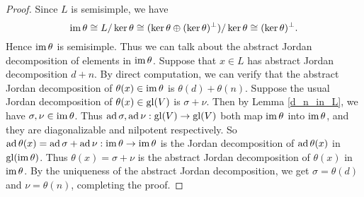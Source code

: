 \begin{proof}
    Since $L$ is semisimple, we have 
    \[
        \operatorname{im} \theta \cong L / \ker \theta \cong (\ker \theta \oplus (\ker \theta )^\perp) / \ker \theta \cong (\ker \theta)^\perp.
    \]
    Hence $\operatorname{im} \theta$ is semisimple. Thus we can talk about the abstract Jordan decomposition of elements in $\operatorname{im}\theta$. Suppose that $x\in L$ has abstract Jordan decomposition $d+n$. By direct computation, we can verify that the abstract Jordan decomposition of $\theta(x)\in\operatorname{im} \theta$ is $\theta(d)+\theta(n)$. Suppose the usual Jordan decomposition of $\theta(x)\in\mathrm{gl}(V)$ is $\sigma+\nu$. Then by Lemma \ref{d_n_in_L}, we have $\sigma,\nu\in \operatorname{im} \theta$. Thus $\operatorname{ad} \sigma,\operatorname{ad} \nu:\mathrm{gl}(V)\to \mathrm{gl}(V)$ both map $\operatorname{im}\theta$ into $\operatorname{im}\theta$, and they are diagonalizable and nilpotent respectively. So $\operatorname{ad} \theta(x)=\operatorname{ad} \sigma+\operatorname{ad} \nu:\operatorname{im}\theta\to \operatorname{im} \theta$ is the Jordan decomposition of $\operatorname{ad} \theta(x)$ in $\mathrm{gl}(\operatorname{im} \theta)$. Thus $\theta(x)=\sigma+\nu$ is the abstract Jordan decomposition of $\theta(x)$ in $\operatorname{im}\theta$. By the uniqueness of the abstract Jordan decomposition, we get $\sigma=\theta(d)$ and $\nu=\theta(n)$, completing the proof.
\end{proof}
















